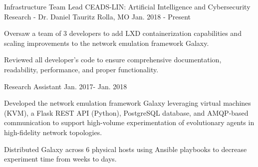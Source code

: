 \begin{cventries}



\cventry
  {Infrastructure Team Lead} %
  {CEADS-LIN: Artificial Intelligence and Cybersecurity Research - Dr. Daniel Tauritz} %
  {Rolla, MO} %
  {Jan. 2018 - Present} %
  {
    \begin{cvitems} %
      \item {Oversaw a team of 3 developers to add LXD containerization
        capabilities and scaling improvements to the network emulation framework
        Galaxy.}
      \item {Reviewed all developer's code to ensure comprehensive
        documentation, readability, performance, and proper functionality.}
    \end{cvitems}
  }

\cventry
  {Research Assistant} %
  {} %
  {} %
  {Jan. 2017- Jan. 2018} %
  {
    \begin{cvitems} %
      \item {Developed the network emulation framework Galaxy leveraging virtual
        machines (KVM), a Flask REST API (Python), PostgreSQL database, and
        AMQP-based communication to support high-volume experimentation of
        evolutionary agents in high-fidelity network topologies.}
      \item {Distributed Galaxy across 6 physical hosts using Ansible playbooks
        to decrease experiment time from weeks to days.}
    \end{cvitems}
  }


\end{cventries}
